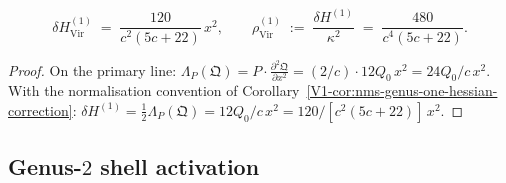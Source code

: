 \begin{corollary}
\ClaimStatusProvedHere
{}
\begin{equation}%
\delta H^{(1)}_{\mathrm{Vir}}
\;=\;
\frac{120}{c^2(5c+22)}\,x^2,
\qquad
\rho^{(1)}_{\mathrm{Vir}}
\;:=\;
\frac{\delta H^{(1)}}{\kappa^2}
\;=\;
\frac{480}{c^4(5c+22)}.
\end{equation}
\end{corollary}

\begin{proof}
On the primary line: $\Lambda_P(\mathfrak{Q}) =
P\cdot\frac{\partial^2\mathfrak{Q}}{\partial x^2}
= (2/c)\cdot 12Q_0\,x^2 = 24Q_0/c\,x^2$.
With the normalisation convention of
Corollary~\ref{V1-cor:nms-genus-one-hessian-correction}:
$\delta H^{(1)} = \frac{1}{2}\Lambda_P(\mathfrak{Q})
= 12Q_0/c\,x^2 = 120/[c^2(5c+22)]\,x^2$.
\end{proof}



\subsection{Genus-$2$ shell activation}

